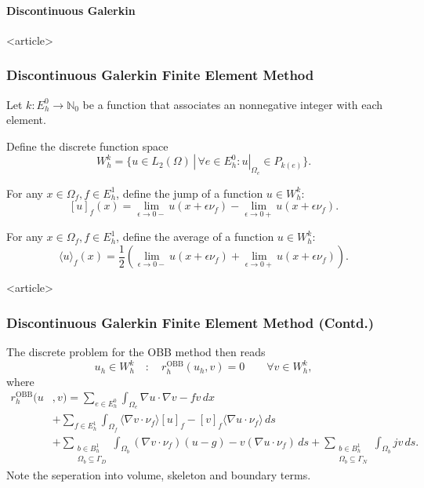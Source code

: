 \paragraph{Discontinuous Galerkin}

\begin{frame}<article>
\frametitle<presentation>{Discontinuous Galerkin Finite Element
Method}
Let $k : E^0_h \to \mathbb{N}_0$ be a function that associates an
nonnegative integer with each element.

Define the discrete function space
\begin{equation*}
W_h^k = \{u\in L_2(\Omega) \,|\, \forall e\in E^0_h : u|_{\Omega_e} \in P_{k(e)}\}.
\end{equation*}

For any $x\in\Omega_f, f\in E_h^1$, define the jump of a function
$u\in W_h^k$:
\begin{equation*}
\label{Eq:Jump}
[u]_f(x) = \lim\limits_{\epsilon\to 0-} u(x+\epsilon\nu_f) - 
\lim\limits_{\epsilon\to 0+} u(x+\epsilon\nu_f).
\end{equation*}

For any $x\in\Omega_f, f\in E_h^1$, define the average of a function
$u\in W_h^k$:
\begin{equation*}
\label{Eq:Average}
\langle u\rangle_f(x) = \frac{1}{2}\left(\lim\limits_{\epsilon\to 0-} u(x+\epsilon
\nu_f) +  \lim\limits_{\epsilon\to 0+} u(x+\epsilon
\nu_f)\right ).
\end{equation*}

\end{frame}


\begin{frame}<article>
\frametitle<presentation>{Discontinuous Galerkin Finite Element
Method (Contd.)}
The discrete problem for the OBB method \cite{OBB98} then reads
\begin{equation*}
u_h \in W^k_h \quad : \quad r_h^\text{OBB}(u_h,v) = 0 \qquad \forall v\in W_h^k,
\end{equation*}
where
\begin{equation*}
\begin{split}
r_h^\text{OBB}(u &,v) = \sum_{e\in E_h^0} \int_{\Omega_e} \nabla u\cdot \nabla v
 - fv \, dx \\
&+ \sum_{f\in E^1_h} \int_{\Omega_f} \langle \nabla v\cdot\nu_f\rangle [u]_f
- [v]_f \langle \nabla u\cdot \nu_f\rangle \, ds\\
&+ \sum_{\substack{b\in B^1_h\\\Omega_b\subseteq\Gamma_D}} \int_{\Omega_b} (\nabla v\cdot\nu_f) (u-g)
- v (\nabla u\cdot \nu_f) \, ds + \sum_{\substack{b\in
B^1_h\\\Omega_b\subseteq\Gamma_N}} \int_{\Omega_b} j v \,ds .
\end{split}
\end{equation*}
Note the seperation into volume, skeleton and boundary terms.
\end{frame}



